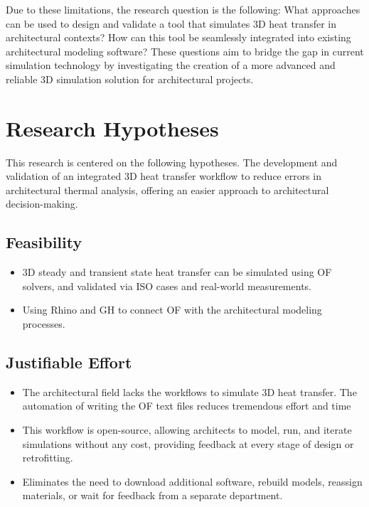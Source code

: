 Due to these limitations, the research question is the following: What approaches can be used to design and validate a tool that simulates 3D heat transfer in architectural contexts? How can this tool be seamlessly integrated into existing architectural modeling software? These questions aim to bridge the gap in current simulation technology by investigating the creation of a more advanced and reliable 3D simulation solution for architectural projects.

\section{Research Hypotheses}
This research is centered on the following hypotheses.
The development and validation of an integrated 3D heat transfer workflow to reduce errors in architectural thermal analysis, offering an easier approach to architectural decision-making.

\subsection{Feasibility}
\begin{itemize}
    \item 3D steady and transient state heat transfer can be simulated using \gls{OF} solvers, and validated via ISO cases and real-world measurements.
    \item Using Rhino and \gls{GH} to connect \gls{OF} with the architectural modeling processes. 
\end{itemize}

\subsection{Justifiable Effort}
\begin{itemize}
    \item The architectural field lacks the workflows to simulate 3D heat transfer.  The automation of writing the OF text files reduces tremendous effort and time
    \item This workflow is open-source, allowing architects to model, run, and iterate simulations without any cost, providing feedback at every stage of design or retrofitting.

    \item Eliminates the need to download additional software, rebuild models, reassign materials, or wait for feedback from a separate department.
\end{itemize}

